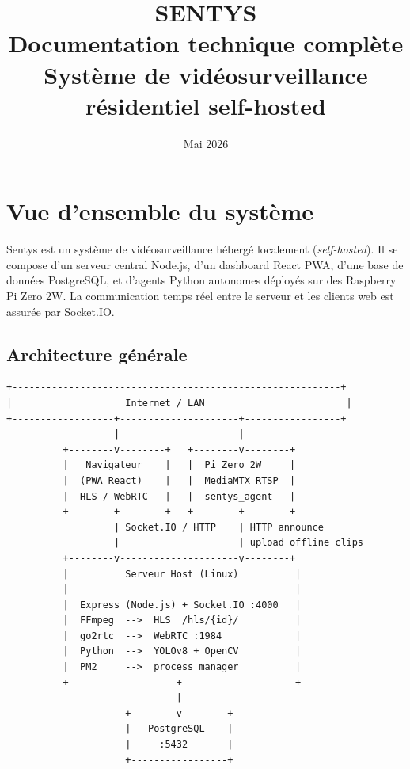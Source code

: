 \documentclass[12pt,a4paper]{article}
\title{
  \vspace{2cm}
  {\Huge \textbf{SENTYS}} \\[0.5em]
  {\large Documentation technique complète} \\[2em]
  {\normalsize Système de vidéosurveillance résidentiel self-hosted}
  \vspace{2cm}
}
\author{}
\date{Mai 2026}
\begin{document}
\maketitle
\thispagestyle{empty}

\newpage
\tableofcontents
\newpage

\section{Vue d'ensemble du système}

Sentys est un système de vidéosurveillance hébergé localement (\emph{self-hosted}).
Il se compose d'un serveur central Node.js, d'un dashboard React PWA, d'une base de
données PostgreSQL, et d'agents Python autonomes déployés sur des Raspberry Pi Zero 2W.
La communication temps réel entre le serveur et les clients web est assurée par Socket.IO.

\subsection{Architecture générale}

\begin{lstlisting}[caption={Schéma d'ensemble}]
+----------------------------------------------------------+
|                    Internet / LAN                         |
+------------------+---------------------+-----------------+
                   |                     |
          +--------v--------+   +--------v--------+
          |   Navigateur    |   |  Pi Zero 2W     |
          |  (PWA React)    |   |  MediaMTX RTSP  |
          |  HLS / WebRTC   |   |  sentys_agent   |
          +--------+--------+   +--------+--------+
                   | Socket.IO / HTTP    | HTTP announce
                   |                     | upload offline clips
          +--------v---------------------v--------+
          |          Serveur Host (Linux)          |
          |                                        |
          |  Express (Node.js) + Socket.IO :4000   |
          |  FFmpeg  -->  HLS  /hls/{id}/          |
          |  go2rtc  -->  WebRTC :1984             |
          |  Python  -->  YOLOv8 + OpenCV          |
          |  PM2     -->  process manager          |
          +-------------------+--------------------+
                              |
                     +--------v--------+
                     |   PostgreSQL    |
                     |     :5432       |
                     +-----------------+
\end{lstlisting}
\end{document}
